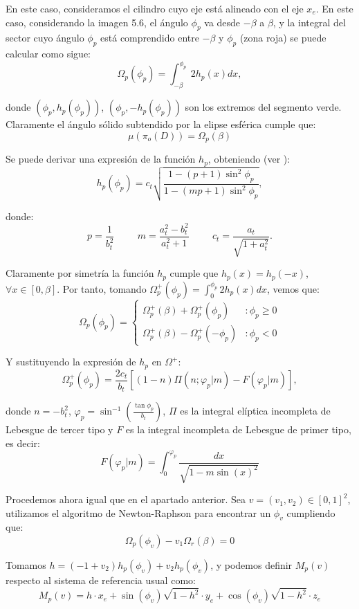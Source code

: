 En este caso, consideramos el cilindro cuyo eje está alineado con el eje $x_e$. En este caso, considerando la imagen 5.6, el ángulo $\phi_p$ va desde $-\beta$ a $\beta$, y la integral del sector cuyo ángulo $\phi_p$ está comprendido entre $-\beta$ y $\phi_p$ (zona roja) se puede calcular como sigue:
$$\Omega_p(\phi_p)=\int_{-\beta}^{\phi_p}2h_p(x)dx,$$

donde $(\phi_p, h_p(\phi_p))$, $(\phi_p, -h_p(\phi_p))$ son los extremos del segmento verde. Claramente el ángulo sólido subtendido por la elipse esférica cumple que:
$$\mu(\pi_o(D)) = \Omega_p(\beta)$$

Se puede derivar una expresión de la función $h_p$, obteniendo (ver \cite{Guillen2017}):
$$h_p(\phi_p)=c_t\sqrt{\frac{1-(p+1)\sin^2\phi_p}{1-(mp+1)\sin^2\phi_p}},$$

donde:
$$p=\frac{1}{b_t^2} \hspace{1cm} m=\frac{a_t^2-b_t^2}{a_t^2+1} \hspace{1cm} c_t=\frac{a_t}{\sqrt{1+a_t^2}}.$$

Claramente por simetría la función $h_p$ cumple que $h_p(x) = h_p(-x)$, $\forall x \in [0,\beta]$. Por tanto, tomando $\Omega_p^+(\phi_p)=\int_0^{\phi_p}2h_p(x)dx$, vemos que:
\[ \Omega_p(\phi_p) =
   \begin{cases}
      \Omega_p^+(\beta)+\Omega_p^+(\phi_p) & :\phi_p\geq0 \\
      \Omega_p^+(\beta)-\Omega_p^+(-\phi_p) & :\phi_p <0
   \end{cases}
  \]

Y sustituyendo la expresión de $h_p$ en $\Omega^+$:
$$\Omega_p^+(\phi_p)=\frac{2c_t}{b_t}[(1-n)\Pi(n;\varphi_p|m)-F(\varphi_p|m)],$$

donde $n=-b_t^2$, $\varphi_p=\sin^{-1}(\frac{\tan\phi_p}{b_t})$, $\Pi$ es la integral elíptica incompleta de Lebesgue de tercer tipo y $F$ es la integral incompleta de Lebesgue de primer tipo, es decir:
$$F(\varphi_p | m) = \int_0^{\varphi_p}\frac{dx}{\sqrt{1-m\sin(x)^2}} $$

Procedemos ahora igual que en el apartado anterior. Sea $v=(v_1,v_2)\in[0,1]^2$, utilizamos el algoritmo de Newton-Raphson para encontrar un $\phi_v$ cumpliendo que:
$$\Omega_p(\phi_v)-v_1\Omega_r(\beta) = 0 $$

Tomamos $h = (-1+v_2)h_p(\phi_v) + v_2h_p(\phi_v)$, y podemos definir $M_p(v)$ respecto al sistema de referencia usual como:
$$M_p(v) = h\cdot x_e +\sin(\phi_v)\sqrt{1-h^2}\cdot y_e + \cos(\phi_v)\sqrt{1-h^2}\cdot z_e$$


